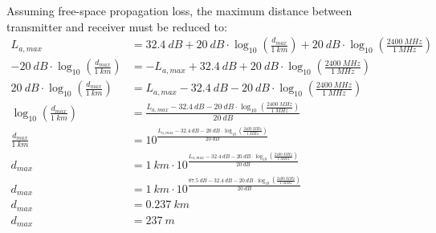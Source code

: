 \begin{solution}
\begin{tasks}
		Assuming free-space propagation loss, the maximum distance between transmitter and receiver must be reduced to:
		\begin{equation*}
			\begin{split}
				L_{a,max} &= \SI{32.4}{dB} + \SI{20}{dB} \cdot \log_{10}\left(\frac{d_{max}}{\SI{1}{km}}\right) + \SI{20}{dB} \cdot \log_{10}\left(\frac{\SI{2400}{MHz}}{\SI{1}{MHz}}\right) \\
				- \SI{20}{dB} \cdot \log_{10}\left(\frac{d_{max}}{\SI{1}{km}}\right) &= - L_{a,max} + \SI{32.4}{dB} + \SI{20}{dB} \cdot \log_{10}\left(\frac{\SI{2400}{MHz}}{\SI{1}{MHz}}\right) \\
				\SI{20}{dB} \cdot \log_{10}\left(\frac{d_{max}}{\SI{1}{km}}\right) &= L_{a,max} - \SI{32.4}{dB} - \SI{20}{dB} \cdot \log_{10}\left(\frac{\SI{2400}{MHz}}{\SI{1}{MHz}}\right) \\
				\log_{10}\left(\frac{d_{max}}{\SI{1}{km}}\right) &= \frac{L_{a,max} - \SI{32.4}{dB} - \SI{20}{dB} \cdot \log_{10}\left(\frac{\SI{2400}{MHz}}{\SI{1}{MHz}}\right)}{\SI{20}{dB}} \\
				\frac{d_{max}}{\SI{1}{km}} &= 10^{\frac{L_{a,max} - \SI{32.4}{dB} - \SI{20}{dB} \cdot \log_{10}\left(\frac{\SI{2400}{MHz}}{\SI{1}{MHz}}\right)}{\SI{20}{dB}}} \\
				d_{max} &= \SI{1}{km} \cdot 10^{\frac{L_{a,max} - \SI{32.4}{dB} - \SI{20}{dB} \cdot \log_{10}\left(\frac{\SI{2400}{MHz}}{\SI{1}{MHz}}\right)}{\SI{20}{dB}}} \\
				d_{max} &= \SI{1}{km} \cdot 10^{\frac{\SI{87.5}{dB} - \SI{32.4}{dB} - \SI{20}{dB} \cdot \log_{10}\left(\frac{\SI{2400}{MHz}}{\SI{1}{MHz}}\right)}{\SI{20}{dB}}} \\
				d_{max} &= \SI{0.237}{km} \\
				d_{max} &= \SI{237}{m}
			\end{split}
		\end{equation*}
	\end{tasks}
\end{solution}

%	
%
%	

